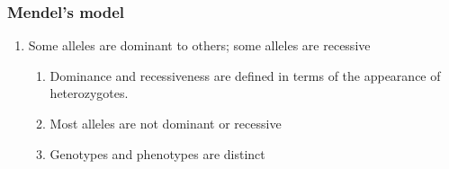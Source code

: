 \begin{frame}
    \frametitle{Mendel's model}
    \begin{enumerate}[<+->]
        \addtocounter{enumi}{3}
        \item Some alleles are dominant to others; some alleles are recessive
            \begin{enumerate}
                \item Dominance and recessiveness are defined 
                    in terms of the appearance of heterozygotes.
                \item Most alleles are not dominant or recessive
                \item Genotypes and phenotypes are distinct
            \end{enumerate}
    \end{enumerate}

\end{frame}

